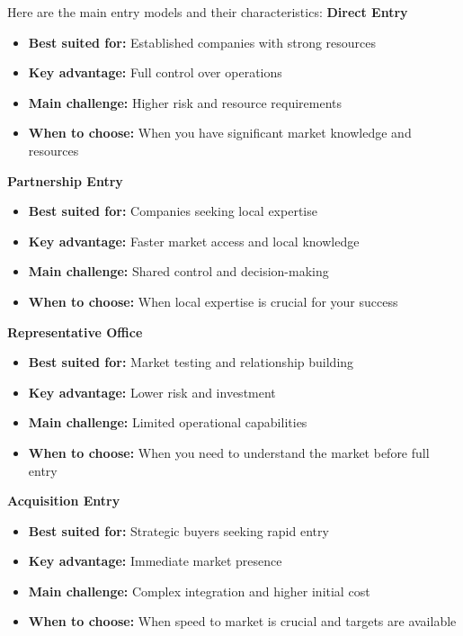 Here are the main entry models and their characteristics:\linebreak
\vspace{1em}
\textbf{Direct Entry}
\begin{itemize}
    \item \textbf{Best suited for:} Established companies with strong resources
    \item \textbf{Key advantage:} Full control over operations
    \item \textbf{Main challenge:} Higher risk and resource requirements
    \item \textbf{When to choose:} When you have significant market knowledge and resources
\end{itemize}
\vspace{1em}
\textbf{Partnership Entry}
\begin{itemize}
    \item \textbf{Best suited for:} Companies seeking local expertise
    \item \textbf{Key advantage:} Faster market access and local knowledge
    \item \textbf{Main challenge:} Shared control and decision-making
    \item \textbf{When to choose:} When local expertise is crucial for your success
\end{itemize}
\vspace{1em}
\textbf{Representative Office}
\begin{itemize}
    \item \textbf{Best suited for:} Market testing and relationship building
    \item \textbf{Key advantage:} Lower risk and investment
    \item \textbf{Main challenge:} Limited operational capabilities
    \item \textbf{When to choose:} When you need to understand the market before full entry
\end{itemize}
\vspace{1em}
\textbf{Acquisition Entry}
\begin{itemize}
    \item \textbf{Best suited for:} Strategic buyers seeking rapid entry
    \item \textbf{Key advantage:} Immediate market presence
    \item \textbf{Main challenge:} Complex integration and higher initial cost
    \item \textbf{When to choose:} When speed to market is crucial and targets are available
\end{itemize}
